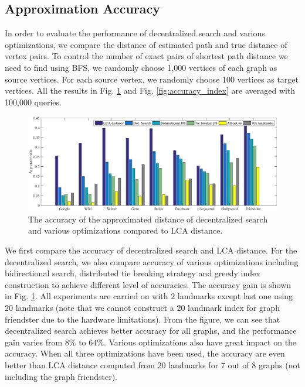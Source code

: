 \subsection{Approximation Accuracy}
\label{eval_accuracy}

In order to evaluate the performance of decentralized search and various optimizations, we compare the distance of estimated path and true distance of vertex pairs. To control the number of exact pairs of shortest path distance we need to find using BFS, we randomly choose 1,000 vertices of each graph as source vertices. For each source vertex, we randomly choose 100 vertices as target vertices. All the results in Fig. \ref{fig:accuracy_dec} and Fig. \ref{fig:accuracy_index} are averaged with 100,000 queries.

\begin{figure}[t]
    \centering
    \includegraphics[width=\linewidth]{./figures/accuracy_dec.pdf}
    \caption{The accuracy of the approximated distance of decentralized search and various optimizations compared to LCA distance.}
    \label{fig:accuracy_dec}
\end{figure}

We first compare the accuracy of decentralized search and LCA distance. For the decentralized search, we also compare accuracy of various optimizations including bidirectional search, distributed tie breaking strategy and greedy index construction to achieve different level of accuracies. The accuracy gain is shown in Fig. \ref{fig:accuracy_dec}. All experiments are carried on with $2$ landmarks except last one using $20$ landmarks (note that we cannot construct a $20$ landmark index for graph friendster due to the hardware limitations). From the figure, we can see that decentralized search achieves better accuracy for all graphs, and the performance gain varies from $8\%$ to $64\%$. Various optimizations also have great impact on the accuracy. When all three optimizations have been used, the accuracy are even better than LCA distance computed from $20$ landmarks for $7$ out of $8$ graphs (not including the graph friendster).

